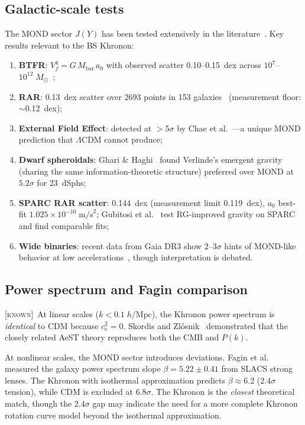 \documentclass[prd,twocolumn,superscriptaddress,longbibliography,floatfix]{revtex4-2}
\newcommand{\Msun}{M_\odot}
\newcommand{\cs}{c_{\mathrm{s}}}
\newcommand{\known}{\textsc{[known]}}
\begin{document}
\subsection{Galactic-scale tests}

The MOND sector $J(Y)$ has been tested extensively in the
literature~\cite{FamaeyMcGaugh2012,Lelli2017,SPARC2016}.
Key results relevant to the BS Khronon:

\begin{enumerate}
\item \textbf{BTFR}: $V_f^4 = G\,M_{\mathrm{bar}}\,a_0$ with
  observed scatter 0.10--0.15~dex across
  $10^7$--$10^{12}\;\Msun$~\cite{McGaugh2012,Lelli2019};
\item \textbf{RAR}: 0.13~dex scatter over 2693 points in 153
  galaxies~\cite{McGaugh2016RAR} (measurement floor:
  $\sim$0.12~dex);
\item \textbf{External Field Effect}: detected at $>5\sigma$
  by Chae et al.~\cite{Chae2020}---a unique MOND prediction
  that $\Lambda$CDM cannot produce;
\item \textbf{Dwarf spheroidals}: Ghari \&
  Haghi~\cite{GhariHaghi2026} found Verlinde's emergent gravity
  (sharing the same information-theoretic structure) preferred
  over MOND at $5.2\sigma$ for 23~dSphs;
\item \textbf{SPARC RAR scatter}: 0.144~dex (measurement
  limit 0.119~dex), $a_0$ best-fit
  $1.025 \times 10^{-10}\;\mathrm{m/s}^2$;
  Gubitosi et al.~\cite{Gubitosi2024} test RG-improved gravity
  on SPARC and find comparable fits;
\item \textbf{Wide binaries}: recent data from Gaia DR3 show
  $2$--$3\sigma$ hints of MOND-like behavior at low
  accelerations~\cite{Chae2024WB}, though interpretation is
  debated.
\end{enumerate}

\subsection{Power spectrum and Fagin comparison}

\known\  At linear scales ($k < 0.1\;h/\mathrm{Mpc}$), the
Khronon power spectrum is \emph{identical} to CDM because
$\cs^2 = 0$.  Skordis and Zl\'{o}snik~\cite{SZ2021prl}
demonstrated that the closely related AeST theory reproduces
both the CMB and $P(k)$.

At nonlinear scales, the MOND sector introduces deviations.
Fagin et al.~\cite{Fagin2024} measured the galaxy power spectrum
slope $\beta = 5.22 \pm 0.41$ from SLACS strong lenses.  The
Khronon with isothermal approximation predicts
$\beta \approx 6.2$ ($2.4\sigma$ tension), while CDM is
excluded at $6.8\sigma$.  The Khronon is the \emph{closest}
theoretical match, though the $2.4\sigma$ gap may indicate
the need for a more complete Khronon rotation curve model
beyond the isothermal approximation.
\end{document}
